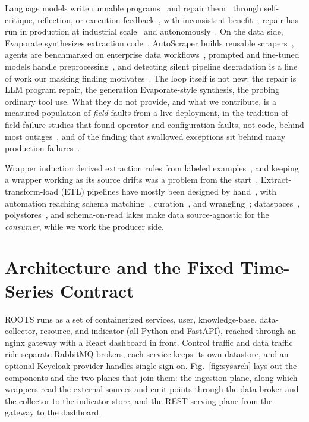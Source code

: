 \documentclass[conference]{IEEEtran}
\newcommand{\Sys}{ROOTS}
\begin{document}
Language models write runnable programs~\cite{chen2021evaluating} and repair
them~\cite{xia2023automated} through self-critique, reflection, or execution
feedback~\cite{madaan2023selfrefine,shinn2023reflexion,chen2024selfdebug}, with
inconsistent benefit~\cite{olausson2024selfrepair}; repair has run in production at
industrial scale~\cite{marginean2019sapfix,bader2019getafix} and
autonomously~\cite{bouzenia2024repairagent}. On the data side, Evaporate synthesizes
extraction code~\cite{arora2023evaporate}, AutoScraper builds reusable
scrapers~\cite{huang2024autoscraper}, agents are benchmarked on enterprise data
workflows~\cite{lei2025spider2}, prompted and fine-tuned models handle
preprocessing~\cite{narayan2022wrangle,zhang2024jellyfish}, and detecting silent
pipeline degradation is a line of work our masking finding
motivates~\cite{tu2023autovalidate}. The loop itself is not new: the repair is LLM program repair, the generation
Evaporate-style synthesis, the probing ordinary tool use. What they do not provide,
and what we contribute, is a measured population of \emph{field} faults from a live
deployment, in the tradition of field-failure studies that found operator and
configuration faults, not code, behind most outages~\cite{gray1986why,oppenheimer2003why},
and of the finding that swallowed exceptions sit behind many production
failures~\cite{yuan2014simple}.

Wrapper induction derived extraction rules from labeled
examples~\cite{kushmerick2000wrapper,crescenzi2001roadrunner,laender2002brief,ferrara2014web},
and keeping a wrapper working as its source drifts was a problem from the
start~\cite{kushmerick2000verification,lerman2003wrapper}. Extract-transform-load
(ETL) pipelines have mostly been designed by
hand~\cite{vassiliadis2002conceptual,vassiliadis2009survey}, with automation reaching
schema matching~\cite{rahm2001survey}, curation~\cite{stonebraker2013tamer}, and
wrangling~\cite{furche2016wrangling}; dataspaces~\cite{franklin2005dataspaces},
polystores~\cite{duggan2015bigdawg}, and schema-on-read lakes make data
source-agnostic for the \emph{consumer}, while we work the producer side.

\section{Architecture and the Fixed Time-Series Contract}
\label{sec:arch}

\Sys{} runs as a set of containerized services, user, knowledge-base,
data-collector, resource, and indicator (all Python and FastAPI), reached through an
nginx gateway with a React dashboard in front. Control traffic and data traffic
ride separate RabbitMQ brokers, each service keeps its own datastore, and an optional
Keycloak provider handles single sign-on. Fig.~\ref{fig:sysarch} lays out the
components and the two planes that join them: the ingestion plane, along which
wrappers read the external sources and emit points through the data broker and the
collector to the indicator store, and the REST serving plane from the gateway to the
dashboard.
\end{document}
